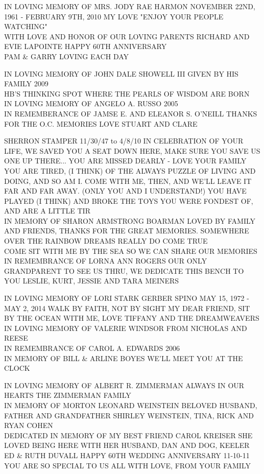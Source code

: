 \documentclass[10pt,letterpaper]{article}
\begin{document}
IN LOVING MEMORY OF MRS. JODY RAE HARMON NOVEMBER 22ND, 1961 {-} FEBRUARY 9TH, 2010 MY LOVE "ENJOY YOUR PEOPLE WATCHING"\\
WITH LOVE AND HONOR OF OUR LOVING PARENTS RICHARD AND EVIE LAPOINTE HAPPY 60TH ANNIVERSARY\\
PAM \& GARRY LOVING EACH DAY

IN LOVING MEMORY OF JOHN DALE SHOWELL III GIVEN BY HIS FAMILY 2009\\
HB'S THINKING SPOT WHERE THE PEARLS OF WISDOM ARE BORN\\
IN LOVING MEMORY OF ANGELO A. RUSSO 2005\\
IN REMEMBERANCE OF JAMSE E. AND ELEANOR S. O'NEILL THANKS FOR THE O.C. MEMORIES LOVE STUART AND CLARE

SHERRON STAMPER 11/30/47 to 4/8/10 IN CELEBRATION OF YOUR LIFE, WE SAVED YOU A SEAT DOWN HERE, MAKE SURE YOU SAVE US ONE UP THERE...  YOU ARE MISSED DEARLY {-} LOVE YOUR FAMILY\\
YOU ARE TIRED, (I THINK) OF THE ALWAYS PUZZLE OF LIVING AND DOING, AND SO AM I.  COME WITH ME, THEN, AND WE'LL LEAVE IT FAR AND FAR AWAY.  (ONLY YOU AND I UNDERSTAND!)  YOU HAVE PLAYED (I THINK) AND BROKE THE TOYS YOU WERE FONDEST OF, AND ARE A LITTLE TIR\\
IN MEMORY OF SHARON ARMSTRONG BOARMAN LOVED BY FAMILY AND FRIENDS, THANKS FOR THE GREAT MEMORIES.  SOMEWHERE OVER THE RAINBOW DREAMS REALLY DO COME TRUE\\
COME SIT WITH ME BY THE SEA SO WE CAN SHARE OUR MEMORIES IN REMEMBRANCE OF LORNA ANN ROGERS OUR ONLY GRANDPARENT TO SEE US THRU, WE DEDICATE THIS BENCH TO YOU LESLIE, KURT, JESSIE AND TARA MEINERS

IN LOVING MEMORY OF LORI STARK GERBER SPINO MAY 15, 1972 {-} MAY 2, 2014 WALK BY FAITH, NOT BY SIGHT MY DEAR FRIEND, SIT BY THE OCEAN WITH ME, LOVE TIFFANY AND THE DREAMWEAVERS\\
IN LOVING MEMORY OF VALERIE WINDSOR FROM NICHOLAS AND REESE\\
IN REMEMBRANCE OF CAROL A. EDWARDS 2006\\
IN MEMORY OF BILL \& ARLINE BOYES WE'LL MEET YOU AT THE CLOCK

IN LOVING MEMORY OF ALBERT R. ZIMMERMAN ALWAYS IN OUR HEARTS THE ZIMMERMAN FAMILY\\
IN MEMORY OF MORTON LEONARD WEINSTEIN BELOVED HUSBAND, FATHER AND GRANDFATHER SHIRLEY WEINSTEIN, TINA, RICK AND RYAN COHEN\\
DEDICATED IN MEMORY OF MY BEST FRIEND CAROL KREISER SHE LOVED BEING HERE WITH HER HUSBAND, DAN AND DOG, KEELER\\
ED \& RUTH DUVALL HAPPY 60TH WEDDING ANNIVERSARY 11{-}10{-}11 YOU ARE SO SPECIAL TO US ALL WITH LOVE, FROM YOUR FAMILY
\end{document}
